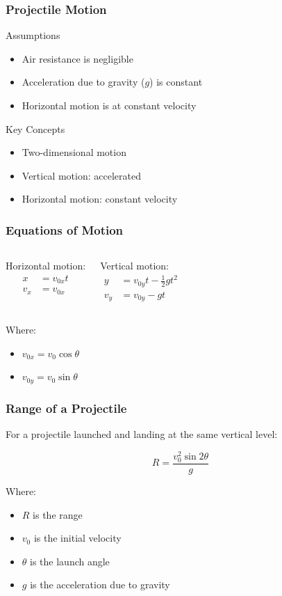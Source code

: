 \documentclass{beamer}
\begin{document}
\begin{frame}
\frametitle{Projectile Motion}
\begin{block}{Assumptions}
\begin{itemize}
\item Air resistance is negligible
\item Acceleration due to gravity ($g$) is constant
\item Horizontal motion is at constant velocity
\end{itemize}
\end{block}

\begin{block}{Key Concepts}
\begin{itemize}
\item Two-dimensional motion
\item Vertical motion: accelerated
\item Horizontal motion: constant velocity
\end{itemize}
\end{block}
\end{frame}

\begin{frame}
\frametitle{Equations of Motion}
\begin{columns}
Horizontal motion:
\begin{align*}
x &= v_{0x} t \\
v_x &= v_{0x}
\end{align*}

Vertical motion:
\begin{align*}
y &= v_{0y} t - \frac{1}{2} g t^2 \\
v_y &= v_{0y} - g t
\end{align*}
\end{columns}

Where:
\begin{itemize}
\item $v_{0x} = v_0 \cos \theta$
\item $v_{0y} = v_0 \sin \theta$
\end{itemize}
\end{frame}

\begin{frame}
\frametitle{Range of a Projectile}
For a projectile launched and landing at the same vertical level:

\[
R = \frac{v_0^2 \sin 2\theta}{g}
\]

Where:
\begin{itemize}
\item $R$ is the range
\item $v_0$ is the initial velocity
\item $\theta$ is the launch angle
\item $g$ is the acceleration due to gravity
\end{itemize}
\end{frame}
\end{document}
